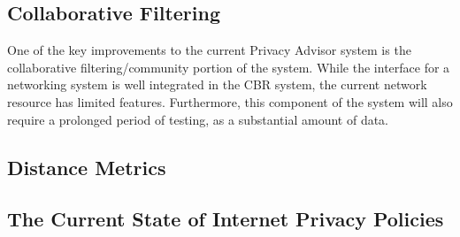 \subsection{Collaborative Filtering} %
One of the key improvements to the current Privacy Advisor system is the
collaborative filtering/community portion of the system. While the interface
for a networking system is well integrated in the CBR system, the current 
network resource has limited features. Furthermore, this component of the system
will also require a prolonged period of testing, as a substantial amount of data.


\subsection{Distance Metrics}







\subsection{The Current State of Internet Privacy Policies}
